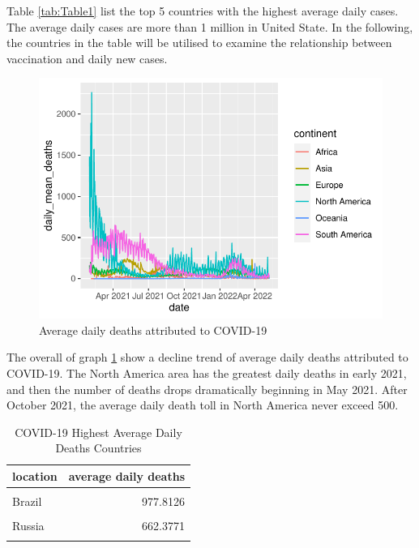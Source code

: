 \documentclass[11pt,a4paper,]{article}
\begin{document}
Table \ref{tab:Table1} list the top 5 countries with the highest average daily cases. The average daily cases are more than 1 million in United State.
In the following, the countries in the table will be utilised to examine the relationship between vaccination and daily new cases.

\begin{figure}

{\centering \includegraphics{report_files/figure-latex/Figure2-1} 

}

\caption{Average daily deaths attributed to COVID-19}\label{fig:Figure2}
\end{figure}

The overall of graph \ref{fig:Figure2} show a decline trend of average daily deaths attributed to COVID-19. The North America area has the greatest daily deaths in early 2021, and then the number of deaths drops dramatically beginning in May 2021. After October 2021, the average daily death toll in North America never exceed 500.

\begin{table}[!h]

\caption{\label{tab:Table2}COVID-19 Highest Average Daily Deaths Countries}
\centering
\begin{tabular}[t]{l|r}
\hline
location & average daily deaths\\
\hline
\cellcolor{gray!6}{United States} & \cellcolor{gray!6}{1200.9892}\\
\hline
Brazil & 977.8126\\
\hline
\cellcolor{gray!6}{India} & \cellcolor{gray!6}{797.7945}\\
\hline
Russia & 662.3771\\
\hline
\cellcolor{gray!6}{Mexico} & \cellcolor{gray!6}{396.0946}\\
\hline
\end{tabular}
\end{table}
\end{document}
